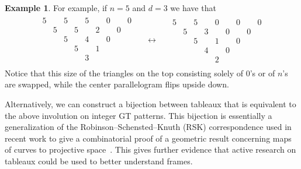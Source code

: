 \documentclass[10pt]{article}
\theoremstyle{plain}
\theoremstyle{definition}
\newtheorem{example}[thm]{Example}
\begin{document}
\begin{example}
For example, if $n=5$ and $d=3$ we have that
\begin{align*}
\begin{matrix}
5 & & 5 & & 5 & & 0 & & 0  \\
& 5 & & 5 & & 2 & & 0  \\
& & 5 & & 4 & & 0 \\ 
& & & 5 & & 1 & & \\ 
& & & & 3 & \\ 
\end{matrix}
&&\longleftrightarrow &&
\begin{matrix}
5 & & 5 & & 0 & & 0 & & 0 \\
&5 & & 3 & & 0 & & 0 \\
&&5 & & 1 & & 0 \\
&&&4 & & 0 \\ 
&&&& 2 
\end{matrix}
\end{align*}
Notice that this size of the triangles on the top consisting solely of $0$'s or of $n$'s are swapped, while the center parallelogram flips upside down. 
\end{example}

Alternatively, we can construct a bijection between tableaux that is equivalent to the above involution on integer GT patterns. This bijection is essentially a generalization of the Robinson–Schensted–Knuth (RSK) correspondence used in recent work to give a combinatorial proof of a geometric result concerning maps of curves to projective space~\cite{GRgeneralized}. This gives further evidence that active research on tableaux could be used to better understand frames.
\end{document}
